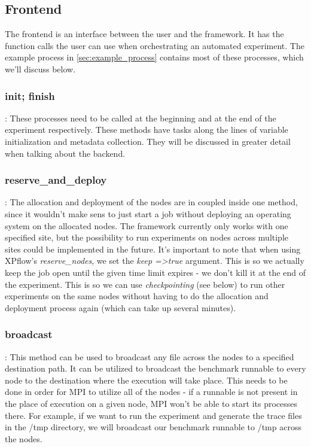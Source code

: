 \subsection{Frontend}
The frontend is an interface between the user and the framework. It
has the function calls the user can use when orchestrating an
automated experiment. The example process in \ref{sec:example_process}
contains most of these processes, which we'll discuss below.
\subsubsection{init; finish}: These processes need to be called at the
beginning and at the end of the experiment respectively. These methods
have tasks along the lines of variable initialization and metadata
collection. They will be discussed in greater detail when talking
about the backend.
\label{keeping_of_nodes}
\subsubsection{reserve\_and\_deploy}: The allocation and deployment of
the nodes are in coupled inside one method, since it wouldn't make
sens to just start a job without deploying an operating system on the
allocated nodes. The framework currently only works with one specified
site, but the possibility to run experiments on nodes across multiple
sites could be implemented in the future. It's important to note that
when using XPflow's \emph{reserve\_nodes}, we set the \emph{keep
  =\textgreater  true} argument. This is so we actually keep the job
open until the
given time limit expires - we don't kill it at the end of the
experiment. This is so we can use \emph{checkpointing} (see below) to
run other experiments on the same nodes without having to do the
allocation and deployment process again (which can take up several
minutes).
\subsubsection{broadcast}: This method can be used to broadcast any file
across the nodes to a specified destination path. It can be utilized
to broadcast the benchmark runnable to every node to the destination
where the execution will take place. This needs to be done in order
for MPI to utilize all of the nodes - if a runnable is not present in
the place of execution on a given node, MPI won't be able to start its
processes there. For example, if we want to run the experiment and
generate the trace files in the /tmp directory, we will broadcast our
benchmark runnable to /tmp across the nodes.
